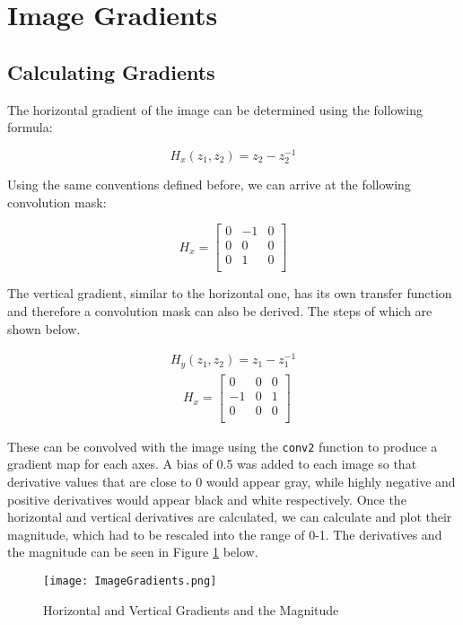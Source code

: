 \section{Image Gradients}
\subsection{Calculating Gradients}
The horizontal gradient of the image can be determined using the following formula:

\begin{equation}
    H_x(z_1, z_2) = z_2 - z_2^{-1} 
\end{equation}

\noindent Using the same conventions defined before, we can arrive at the following convolution mask:

\begin{equation}
    H_x = 
    \begin{bmatrix}
        0 & -1 & 0 \\
        0 &  0 & 0 \\
        0 &  1 & 0 \\
    \end{bmatrix}
\end{equation}

\noindent The vertical gradient, similar to the horizontal one, has its own transfer function and therefore a convolution mask can also be derived. The steps of which are shown below.

\begin{gather}
        H_y(z_1, z_2) = z_1 - z_1^{-1} \\
        \quad
        H_x = 
        \begin{bmatrix}
             0 & 0 & 0 \\
            -1 & 0 & 1 \\
             0 & 0 & 0 \\
        \end{bmatrix}
\end{gather}

\noindent These can be convolved with the image using the \textcolor{MATLABBlue}{\lstinline|conv2|} function to produce a gradient map for each axes. A bias of 0.5 was added to each image so that derivative values that are close to 0 would appear gray, while highly negative and positive derivatives would appear black and white respectively. Once the horizontal and vertical derivatives are calculated, we can calculate and plot their magnitude, which had to be rescaled into the range of 0-1. The derivatives and the magnitude can be seen in Figure \ref{fig:ImageGradient} below.

\begin{figure}[!h]
    \texttt{[image: ImageGradients.png]}
    \centering
    \caption{Horizontal and Vertical Gradients and the Magnitude}
    \label{fig:ImageGradient}
\end{figure}